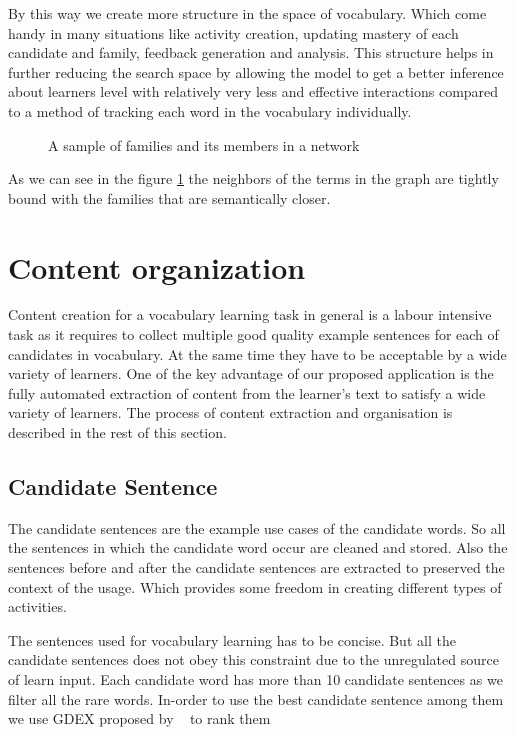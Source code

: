 \documentclass[11pt,a4paper]{article}
\begin{document}
By this way we create more structure in the space of vocabulary. Which come handy in many situations like activity creation, updating mastery of each
candidate and family, feedback generation and analysis. This structure helps in further reducing the search space
by allowing the model to get a better inference about learners level with relatively very less and effective interactions compared to a method of
tracking each word in the vocabulary individually.

\begin{figure}
\begin{tcbraster}[raster columns=1, enhanced, blankest]
\caption{A sample of families and its members in a network}
\end{tcbraster}
\label{fig:neighbor}
\end{figure}

As we can see in the figure \ref{fig:neighbor} the neighbors of the terms in the
graph are tightly bound with the families that are semantically closer.

\section{Content organization}
Content creation for a vocabulary learning task in general is a labour intensive task as it requires to collect multiple good quality example sentences for each of candidates in vocabulary. At the same time they have to be acceptable by a wide variety of learners.
One of the key advantage of our proposed application is the fully automated extraction of content from the learner's text to satisfy a wide variety of learners. The process of content extraction and organisation is described in the rest of this section.

\subsection{Candidate Sentence}
The candidate sentences are the example use cases of the candidate words. So all the sentences in which the candidate word occur are cleaned and stored. Also the sentences before and after the candidate sentences are extracted to preserved the context of the usage. Which provides some freedom in creating different types of activities.

The sentences used for vocabulary learning has to be concise. But all the candidate sentences does not obey this constraint due to the unregulated source of learn input. Each candidate word has more than 10 candidate sentences as we filter all the rare words. In-order to use the best candidate sentence among them we use GDEX proposed by ~\cite{kilgarriff2008gdex} to rank them
\end{document}
